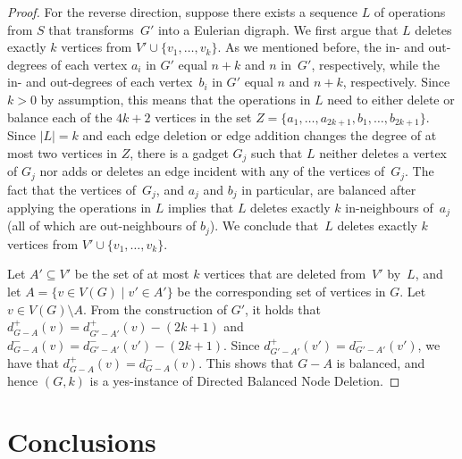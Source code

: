 \documentclass[11pt]{llncs}
\begin{document}
\begin{proof}
For the reverse direction, suppose there exists a sequence $L$ of operations
from $S$ that transforms~$G'$ into a Eulerian digraph. We first argue that $L$
deletes exactly $k$ vertices from $V'\cup \{v_1,\ldots,v_k\}$. 
As we mentioned before, the in- and out-degrees of each vertex $a_i$ in $G'$
equal $n+k$ and $n$ in~$G'$, respectively, while the in- and out-degrees of
each vertex~$b_i$ in $G'$ equal $n$ and $n+k$, respectively.  Since $k>0$ by
assumption, this means that the operations in $L$ need to either delete or
balance each of the $4k+2$ vertices in the set
$Z=\{a_1,\ldots,a_{2k+1},b_1,\ldots,b_{2k+1}\}$. Since $|L|=k$ and each edge
deletion or edge addition changes the degree of at most two vertices in $Z$,
there is a gadget $G_j$ such that $L$ neither deletes a vertex of $G_j$ nor
adds or deletes an edge incident with any of the vertices of~$G_j$. The fact
that the vertices of~$G_j$, and $a_j$ and $b_j$ in particular, are balanced
after applying the operations in $L$ implies that $L$ deletes exactly $k$
in-neighbours of~$a_j$ (all of which are out-neighbours of $b_j$). We conclude
that~$L$ deletes exactly $k$ vertices from $V'\cup \{v_1,\ldots,v_k\}$.

Let $A'\subseteq V'$ be the set of at most $k$ vertices that are deleted
from~$V'$ by~$L$, and let $A=\{v\in V(G) \mid v'\in A'\}$ be the corresponding
set of vertices in $G$. Let $v\in V(G)\setminus A$. From the construction of
$G'$, it holds that 
$d_{G-A}^+(v)=d_{G'-A'}^+(v) -(2k+1)$ and
$d_{G-A}^-(v)=d_{G'-A'}^-(v')-(2k+1)$.  Since
$d_{G'-A'}^+(v')=d_{G'-A'}^-(v')$, we have that $d_{G-A}^+(v)=d_{G-A}^-(v)$.
This shows that $G-A$ is balanced, and hence $(G,k)$ is a yes-instance of {\sc
Directed Balanced Node Deletion}.
\end{proof}


\section{Conclusions}\label{sec:concl}
\end{document}

